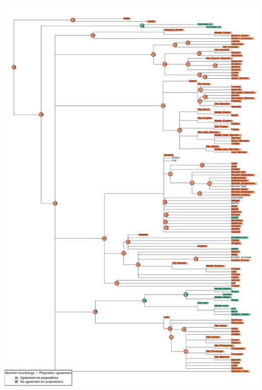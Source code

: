 \includegraphics[width=.9\linewidth]{supp-graphics/NominalmorphologyPrepositionagreementPRONAGR.pdf}

